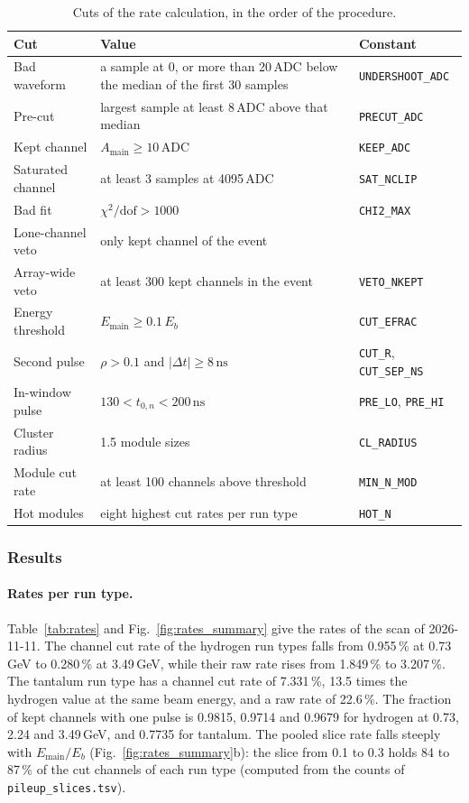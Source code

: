 \documentclass[11pt]{article}
\newcommand{\ns}{\,\mathrm{ns}}
\newcommand{\adc}{\,\mathrm{ADC}}
\newcommand{\code}[1]{\texttt{#1}}
\begin{document}
\begin{table}[htbp]
\centering
\caption{Cuts of the rate calculation, in the order of the procedure.}
\label{tab:ratecuts}
\small
\begin{tabular}{lll}
\toprule
Cut & Value & Constant \\
\midrule
Bad waveform & a sample at 0, or more than 20\,ADC below the median of the first 30 samples & \code{UNDERSHOOT\_ADC} \\
Pre-cut & largest sample at least 8\,ADC above that median & \code{PRECUT\_ADC} \\
Kept channel & $A_{\mathrm{main}} \ge 10\adc$ & \code{KEEP\_ADC} \\
Saturated channel & at least 3 samples at 4095\,ADC & \code{SAT\_NCLIP} \\
Bad fit & $\chi^2/\mathrm{dof} > 1000$ & \code{CHI2\_MAX} \\
Lone-channel veto & only kept channel of the event & \\
Array-wide veto & at least 300 kept channels in the event & \code{VETO\_NKEPT} \\
Energy threshold & $E_{\mathrm{main}} \ge 0.1\,E_b$ & \code{CUT\_EFRAC} \\
Second pulse & $\rho > 0.1$ and $|\Delta t| \ge 8\ns$ & \code{CUT\_R}, \code{CUT\_SEP\_NS} \\
In-window pulse & $130 < t_{0,n} < 200\ns$ & \code{PRE\_LO}, \code{PRE\_HI} \\
Cluster radius & 1.5 module sizes & \code{CL\_RADIUS} \\
Module cut rate & at least 100 channels above threshold & \code{MIN\_N\_MOD} \\
Hot modules & eight highest cut rates per run type & \code{HOT\_N} \\
\bottomrule
\end{tabular}
\end{table}

\subsubsection{Results}

\paragraph{Rates per run type.} Table~\ref{tab:rates} and Fig.~\ref{fig:rates_summary} give the rates of the scan of 2026-11-11. The channel cut rate of the hydrogen run types falls from 0.955\,\% at 0.73\,GeV to 0.280\,\% at 3.49\,GeV, while their raw rate rises from 1.849\,\% to 3.207\,\%. The tantalum run type has a channel cut rate of 7.331\,\%, 13.5 times the hydrogen value at the same beam energy, and a raw rate of 22.6\,\%. The fraction of kept channels with one pulse is 0.9815, 0.9714 and 0.9679 for hydrogen at 0.73, 2.24 and 3.49\,GeV, and 0.7735 for tantalum. The pooled slice rate falls steeply with $E_{\mathrm{main}}/E_b$ (Fig.~\ref{fig:rates_summary}b): the slice from 0.1 to 0.3 holds 84 to 87\,\% of the cut channels of each run type (computed from the counts of \code{pileup\_slices.tsv}).
\end{document}
